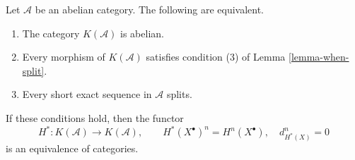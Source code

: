 \begin{lemma}
\label{lemma-homotopy-category-abelian-split}
Let $\mathcal{A}$ be an abelian category. The following are equivalent.
\begin{enumerate}
\item The category $K(\mathcal{A})$ is abelian.
\item Every morphism of $K(\mathcal{A})$ satisfies condition (3) of
Lemma \ref{lemma-when-split}.
\item Every short exact sequence in $\mathcal{A}$ splits.
\end{enumerate}
If these conditions hold, then the functor
$$
H^* : K(\mathcal{A}) \longrightarrow K(\mathcal{A}), \qquad
H^*(X^\bullet)^n = H^n(X^\bullet), \quad d_{H^*(X)}^n = 0
$$
is an equivalence of categories.
\end{lemma}

